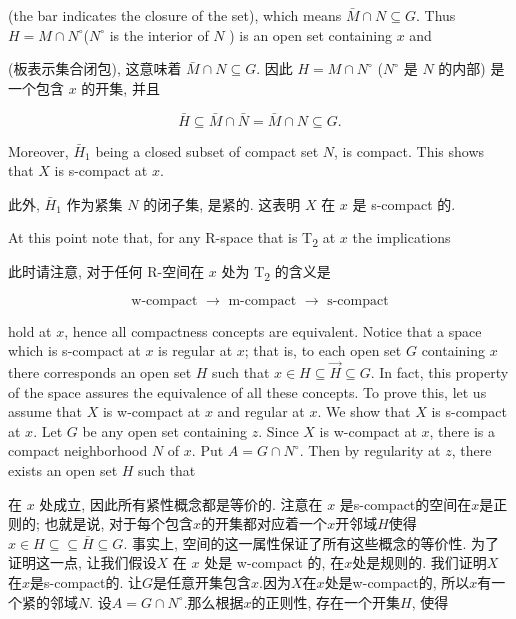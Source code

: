 \documentclass[options]{article}
\begin{document}
\begin{paracol}{2}
	\begin{en}
		(the bar indicates the closure of the set), which means $\bar{M} \cap N \subseteq G$. Thus $H=M \cap N^{\circ}$($N^{\circ}$ is the interior of $N$ ) is an open set containing $x$ and

	\end{en}
	\begin{cn}
		(板表示集合闭包), 这意味着 $\bar{M} \cap N \subseteq G$. 因此 $H=M \cap N^{\circ}$ ($N^{\circ}$ 是 $N$ 的内部) 是一个包含 $x$ 的开集, 并且
	\end{cn}
\end{paracol}
\[
		\bar{H} \subseteq \bar{M} \cap \bar{N}=\bar{M} \cap N \subseteq G .
\]
\begin{paracol}{2}

	\begin{en}
		Moreover, $\bar{H}_1$ being a closed subset of compact set $N$, is compact. This shows
		that $X$ is s-compact at $x$.
	\end{en}
	\begin{cn}
		此外, $\bar{H}_1$ 作为紧集 $N$ 的闭子集, 是紧的. 这表明	$X$ 在 $x$ 是 s-compact 的.
	\end{cn}
	\begin{en}
		At this point note that, for any R-space
		that is T\textsubscript{\!$2$} at $x$ the implications
	\end{en}
	\begin{cn}
		此时请注意, 对于任何 R-空间在 $x$ 处为 T\textsubscript{\!$2$} 的含义是
	\end{cn}
\end{paracol}
\[
		\text { w-compact } \longrightarrow \text { m-compact } \longrightarrow \text { s-compact }
\]
\begin{paracol}{2}
	\begin{en}
		\noindent
		hold at $x$, hence all compactness concepts are equivalent. Notice that a space which is
		s-compact at $x$ is regular at $x$; that is, to each open set $G$ containing $x$ there
		corresponds an open set $H$ such that $x \in H\subseteq \overrightarrow{H}\subseteq G$.
		In fact, this property of the space assures the equivalence of all these concepts. To
		prove this, let us assume that $X$ is w-compact at $x$ and regular at $x$. We show that
		$X$ is s-compact at $x$. Let $G$ be any open set containing $z$. Since $X$ is w-compact
		at $x$, there is a compact neighborhood $N$ of $x$. Put $A=G \cap N^{\circ}$. Then by
		regularity at $z$, there exists an open set $H$ such that
	\end{en}
	\begin{cn}
		\noindent
		在 $x$ 处成立, 因此所有紧性概念都是等价的. 注意在 $x$ 是s-compact的空间在$x$是正则的; 也就是说, 对于每个包含$x$的开集都对应着一个$x$开邻域$H$使得$x \in H\subseteq \subseteq\bar{H} \subseteq G$. 事实上, 空间的这一属性保证了所有这些概念的等价性. 为了证明这一点, 让我们假设$X$ 在 $x$ 处是 w-compact 的, 在$x$处是规则的. 我们证明$X$在$x$是s-compact的. 让$G$是任意开集包含$x$.因为$X$在$x$处是w-compact的, 所以$x$有一个紧的邻域$N$. 设$A=G\cap N^{\circ}$.那么根据$x$的正则性, 存在一个开集$H$, 使得
	\end{cn}
\end{paracol}
\end{document}
